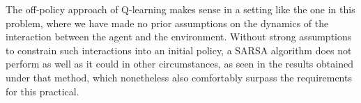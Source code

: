 \documentclass[11pt]{article}
\begin{document}
The off-policy approach of Q-learning makes sense in a setting like the one in this problem, where we have made no prior assumptions on the dynamics of the interaction between the agent and the environment. Without strong assumptions to constrain such interactions into an initial policy, a SARSA algorithm does not perform as well as it could in other circumstances, as seen in the results obtained under that method, which nonetheless also comfortably surpass the requirements for this practical.
\end{document}

